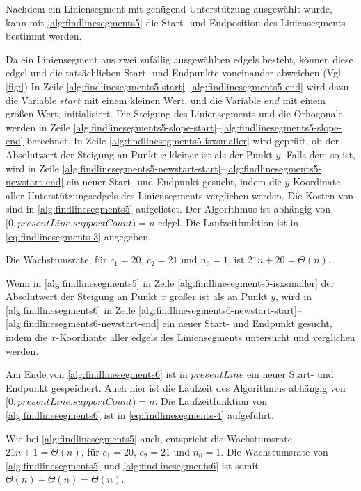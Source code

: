 Nachdem ein Liniensegment mit genügend Unterstützung ausgewählt wurde, kann mit \autoref{alg:findlinesegments5} die
 Start- und Endposition des Liniensegments bestimmt werden.

Da ein Liniensegment aus zwei zufällig ausgewählten \glspl{edgel} besteht, können diese \gls{edgel} und die
 tatsächlichen Start- und Endpunkte voneinander abweichen (Vgl. \autoref{fig:}) In Zeile
 \ref{alg:findlinesegments5-start}--\ref{alg:findlinesegments5-end} wird dazu die Variable $\mathit{start}$ mit einem
 kleinen Wert, und die Variable $\mathit{end}$ mit einem großen Wert, initialisiert. Die Steigung des Liniensegments
 und die Orhogonale werden in Zeile \ref{alg:findlinesegments5-slope-start}--\ref{alg:findlinesegments5-slope-end}
 berechnet. In Zeile \ref{alg:findlinesegments5-isxsmaller} wird geprüft, ob der Absolutwert der Steigung an Punkt $x$
 kleiner ist als der Punkt $y$. Falls dem so ist, wird in Zeile
 \ref{alg:findlinesegments5-newstart-start}--\ref{alg:findlinesegments5-newstart-end} ein neuer Start- und Endpunkt
 gesucht, indem die $y$-Koordinate aller Unterstützungsedgels des Liniensegments verglichen werden. Die Kosten von
  sind in \autoref{alg:findlinesegments5} aufgelistet. Der Algorithmus ist abhängig von
 $[0,\mathit{presentLine.supportCount}) = n$ \gls{edgel}. Die Laufzeitfunktion ist in \autoref{eq:findlinesegments-3}
 angegeben.

Die Wachstumsrate, für $c_{1} = 20$, $c_{2} = 21$ und $n_{0} = 1$, ist $21n + 20 = \Theta(n)$.

Wenn in \autoref{alg:findlinesegments5} in Zeile \ref{alg:findlinesegments5-isxsmaller} der Absolutwert der Steigung an
 Punkt $x$ größer ist als an Punkt $y$, wird in \autoref{alg:findlinesegments6} in Zeile
 \ref{alg:findlinesegments6-newstart-start}--\ref{alg:findlinesegments6-newstart-end} ein neuer Start- und Endpunkt
 gesucht, indem die $x$-Koordiante aller \glspl{edgel} des Liniensegments untersucht und verglichen werden.

Am Ende von \autoref{alg:findlinesegments6} ist in $\mathit{presentLine}$ ein neuer Start- und Endpunkt gespeichert.
 Auch hier ist die Laufzeit des Algorithmus abhängig von $[0,\mathit{presentLine.supportCount}) = n$. Die
 Laufzeitfunktion von \autoref{alg:findlinesegments6} ist in \autoref{eq:findlinesegments-4} aufgeführt.

Wie bei \autoref{alg:findlinesegments5} auch, entspricht die Wachstumsrate $21n + 1 = \Theta(n)$, für
 $c_{1} = 20$, $c_{2} = 21$ und $n_{0} = 1$. Die Wachstumsrate von \autoref{alg:findlinesegments5} und
 \autoref{alg:findlinesegments6} ist somit $\Theta(n) + \Theta(n) = \Theta(n)$.

